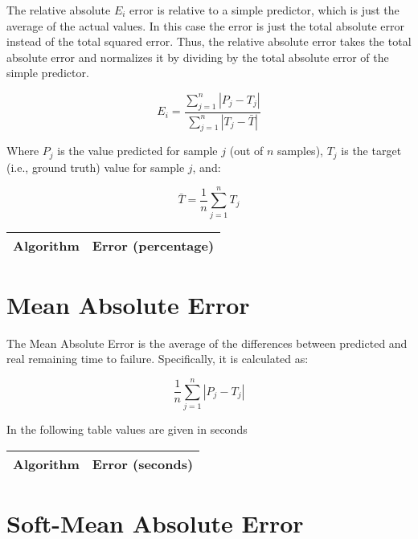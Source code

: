 \documentclass[10pt,a4paper]{article}
\begin{document}
The relative absolute $E_i$ error is relative to a simple predictor, which is just the average of the actual values. In this case the error is just the total absolute error instead of the total squared error. Thus, the relative absolute error takes the total absolute error and normalizes it by dividing by the total absolute error of the simple predictor.

\begin{equation}
E_i = \frac{\sum_{j=1}^n | P_j - T_j | }{\sum_{j=1}^n | T_j - \bar{T} | }
\end{equation}

Where $P_j$ is the value predicted for sample $j$ (out of $n$ samples), $T_j$ is the target (i.e., ground truth) value for sample $j$, and:

\begin{equation}
\bar{T} =  \frac{1}{n} \sum_{j=1}^n T_j
\end{equation}


\begin{center}
\begin{tabular}{cc}
\toprule
\textbf{Algorithm} & \textbf{Error (percentage)} \\
\midrule

\bottomrule
\end{tabular}
\end{center}



\section{Mean Absolute Error}

The Mean Absolute Error is the average of the differences between predicted and real remaining time to failure. Specifically, it is calculated as:

\begin{equation}
\frac{1}{n} \sum_{j=1}^n |P_j - T_j|
\end{equation}

In the following table values are given in seconds

\begin{center}
\begin{tabular}{cc}
\toprule
\textbf{Algorithm} & \textbf{Error (seconds)} \\
\midrule

\bottomrule
\end{tabular}
\end{center}



\section{Soft-Mean Absolute Error}
\end{document}
